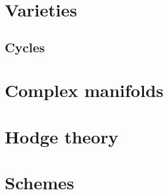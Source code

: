 \documentclass[10pt]{article}
\theoremstyle{definition}
\begin{document}
\section{Varieties}
\label{ch:9}

\subsection{Cycles}
\label{ch:9.11}


\section{Complex manifolds}
\label{ch:10}

\section{Hodge theory}
\label{ch:11}

\section{Schemes}
\label{ch:12}







\end{document}
